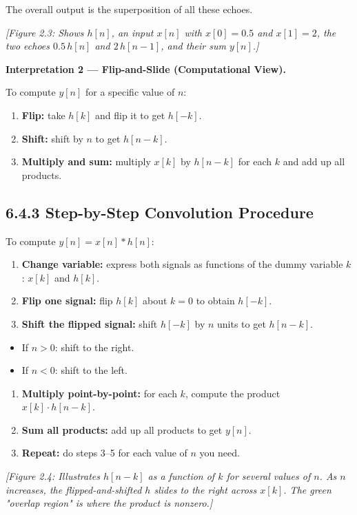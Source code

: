 \documentclass[11pt]{article}
\begin{document}
The overall output is the superposition of all these echoes.

\textit{[Figure 2.3: Shows $h[n]$, an input $x[n]$ with $x[0]=0.5$ and $x[1]=2$, the two echoes $0.5\,h[n]$ and $2\,h[n-1]$, and their sum $y[n]$.]}

\textbf{Interpretation 2 — Flip-and-Slide (Computational View).}

To compute $y[n]$ for a specific value of $n$:

\begin{enumerate}
  \item \textbf{Flip:} take $h[k]$ and flip it to get $h[-k]$.
  \item \textbf{Shift:} shift by $n$ to get $h[n-k]$.
  \item \textbf{Multiply and sum:} multiply $x[k]$ by $h[n-k]$ for each $k$ and add up all products.
\end{enumerate}

\subsection*{6.4.3 Step-by-Step Convolution Procedure}

To compute $y[n] = x[n]*h[n]$:

\begin{enumerate}
  \item \textbf{Change variable:} express both signals as functions of the dummy variable $k$: $x[k]$ and $h[k]$.
  \item \textbf{Flip one signal:} flip $h[k]$ about $k=0$ to obtain $h[-k]$.
  \item \textbf{Shift the flipped signal:} shift $h[-k]$ by $n$ units to get $h[n-k]$.
\end{enumerate}
\begin{itemize}
  \item If $n > 0$: shift to the right.
  \item If $n < 0$: shift to the left.
\end{itemize}
\begin{enumerate}
  \item \textbf{Multiply point-by-point:} for each $k$, compute the product $x[k]\cdot h[n-k]$.
  \item \textbf{Sum all products:} add up all products to get $y[n]$.
  \item \textbf{Repeat:} do steps 3–5 for each value of $n$ you need.
\end{enumerate}

\textit{[Figure 2.4: Illustrates $h[n-k]$ as a function of $k$ for several values of $n$. As $n$ increases, the flipped-and-shifted $h$ slides to the right across $x[k]$. The green "overlap region" is where the product is nonzero.]}
\end{document}
